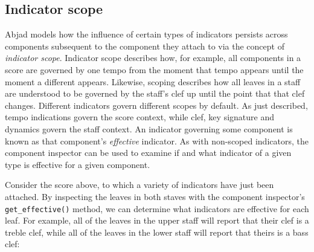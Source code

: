 \subsection{Indicator scope}
\label{ssec:indicator-scope}

Abjad models how the influence of certain types of indicators persists across
components subsequent to the component they attach to via the concept of
\emph{indicator scope}. Indicator scope describes how, for example, all
components in a score are governed by one tempo from the moment that tempo
appears until the moment a different appears. Likewise, scoping describes how
all leaves in a staff are understood to be governed by the staff's clef up
until the point that that clef changes. Different indicators govern different
scopes by default. As just described, tempo indications govern the score
context, while clef, key signature and dynamics govern the staff context. An
indicator governing some component is known as that component's
\emph{effective} indicator. As with non-scoped indicators, the component
inspector can be used to examine if and what indicator of a given type is
effective for a given component.

Consider the score above, to which a variety of indicators have just been
attached. By inspecting the leaves in both staves with the component
inspector's \texttt{get\_effective()} method, we can determine what indicators
are effective for each leaf. For example, all of the leaves in the upper staff
will report that their clef is a treble clef, while all of the leaves in the
lower staff will report that theirs is a bass clef:

\begin{comment}
<abjad>
for leaf in score['Upper Staff'].select_leaves():
    clef = inspect_(leaf).get_effective(Clef)
    print(leaf, clef)

for leaf in score['Lower Staff'].select_leaves():
    clef = inspect_(leaf).get_effective(Clef)
    print(leaf, clef)
</abjad>
\end{comment}


